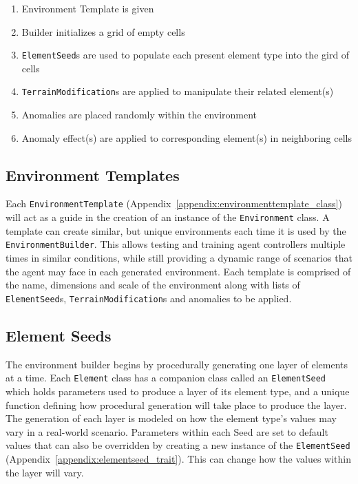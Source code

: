 \begin{enumerate}
  \item Environment Template is given
  \item	Builder initializes a grid of empty cells
  \item	\texttt{ElementSeed}s are used to populate each present element type into the gird of cells
  \item	\texttt{TerrainModification}s are applied to manipulate their related element(s)
  \item	Anomalies are placed randomly within the environment
  \item	Anomaly effect(s) are applied to corresponding element(s) in neighboring cells
\end{enumerate}


\subsection{Environment Templates} \label{subsec:environment_templates}
Each \texttt{EnvironmentTemplate} (Appendix~\ref{appendix:environmenttemplate_class}) will act as a guide in the creation of an instance of the \texttt{Environment} class.
A template can create similar, but unique environments each time it is used by the \texttt{EnvironmentBuilder}.
This allows testing and training agent controllers multiple times in similar conditions, while still providing a dynamic range of scenarios that the agent may face in each generated environment.
Each template is comprised of the name, dimensions and scale of the environment along with lists of \texttt{ElementSeed}s, \texttt{TerrainModification}s and anomalies to be applied.


\subsection{Element Seeds} \label{subsec:element_seeds}
The environment builder begins by procedurally generating one layer of elements at a time.
Each \texttt{Element} class has a companion class called an \texttt{ElementSeed} which holds parameters used to produce a layer of its element type, and a unique function defining how procedural generation will take place to produce the layer.
The generation of each layer is modeled on how the element type's values may vary in a real-world scenario.
Parameters within each Seed are set to default values that can also be overridden by creating a new instance of the \texttt{ElementSeed} (Appendix~\ref{appendix:elementseed_trait}).
This can change how the values within the layer will vary.


